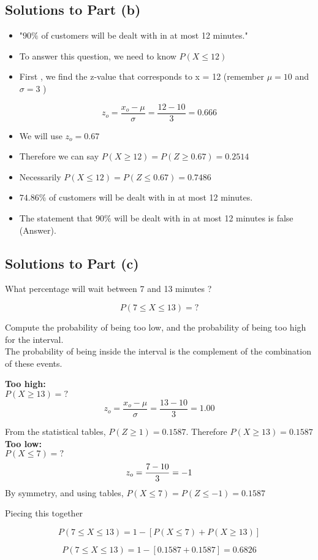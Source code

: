 \documentclass[a4paper,12pt]{article}
\begin{document}
\subsection*{Solutions to Part (b)}
\begin{itemize}
	\item "$90\%$ of customers will be dealt with in at most 12 minutes."
	\item To answer this question, we need to know  $P(X\leq 12)$
	\item First , we find the z-value that corresponds to x = 12  (remember $\mu=10$ and $\sigma=3$ )
\end{itemize}

\[ z_o = { \frac{x_o - \mu} { \sigma }}  = {\frac{ 12 - 10}{ 3 }} = 0.666 \]

	
	\begin{itemize}
		\item We will use $z_o = 0.67$
		\item Therefore we can say $P(X \geq 12 ) = P(Z \geq 0.67)  = 0.2514$
		\item Necessarily  $P(X \leq 12 ) = P(Z \leq 0.67) = 0.7486$
		\item $74.86\%$ of customers will be dealt with in at most 12 minutes.
		\item The statement that $90\%$ will be dealt with in at most 12 minutes is false (Answer).
	\end{itemize}


\subsection*{Solutions to Part (c)}
What percentage will wait between 7 and 13 minutes ?

\[P(7 \leq X \leq 13)   = ?\]


\noindent Compute the probability of being too low, and the probability of being too high for the interval.\\The probability of being inside the interval is the complement of the combination of these events.


\noindent \textbf{Too high:}\\
$P(X \geq 13) = ?$
\[ z_o = { \frac{x_o - \mu} { \sigma }}  = {\frac{ 13 - 10}{ 3 }} = 1.00 \]

\noindent From the statistical tables, $P(Z \geq 1) = 0.1587$. Therefore $P(X \geq 13) = 0.1587$\\ \bigskip
\noindent \textbf{Too low:}\\
$P(X \leq 7) = ?$
\[ z_o  = {7 - 10  \over 3} = -1\]
By symmetry, and using tables, $P(X \leq 7) = P(Z \leq -1)= 0.1587$\\ \bigskip

\noindent Piecing this together

\[P(7 \leq X \leq 13)  = 1 - [ P(X \leq 7)  + P(X \geq 13) ] \]

\[P(7 \leq X \leq 13)  =  1 - [0.1587+0.1587] = 0.6826\]
\end{document}
